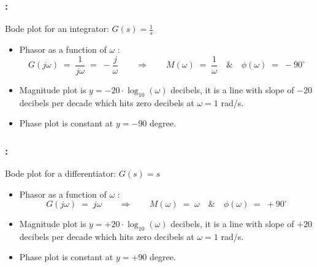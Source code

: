 \documentclass[ 10pt, xcolor = dvipsnames]{beamer}
\begin{document}
\begin{frame}[allowframebreaks]
\frametitle{\insertsection: \insertsubsection}

Bode plot for an integrator: $\displaystyle G(s) = \frac{1}{s}$
\begin{itemize}
\item Phasor as a function of $\omega$ : 
\[
G(j\omega) \; = \; \frac{1}{j\omega} \; = \; -\frac{j}{\omega} 
\qquad \Longrightarrow \qquad
M(\omega) \; = \; \frac{1}{\omega} \quad \& \quad
\phi(\omega) \; = \; -90^{\circ}
\]
\item Magnitude plot is $y = -20 \cdot \log_{10}(\omega)$ decibels, \ie it is a line with slope of $-20$ decibels per decade which hits zero decibels at $\omega = 1$ rad/s. 
\item Phase plot is constant at $y = -90$ degree. 
\end{itemize}

\end{frame}

\begin{frame}[allowframebreaks]
\frametitle{\insertsection: \insertsubsection}

Bode plot for a differentiator: $\displaystyle G(s) = s$
\begin{itemize}
\item Phasor as a function of $\omega$ : 
\[
G(j\omega) \; = \; j\omega \qquad \Longrightarrow \qquad
M(\omega) \; = \; \omega \quad \& \quad
\phi(\omega) \; = \; +90^{\circ}
\]
\item Magnitude plot is $y = +20 \cdot \log_{10}(\omega)$ decibels, \ie it is a line with slope of $+20$ decibels per decade which hits zero decibels at $\omega = 1$ rad/s. 
\item Phase plot is constant at $y = +90$ degree. 
\end{itemize}

\end{frame}
\end{document}
